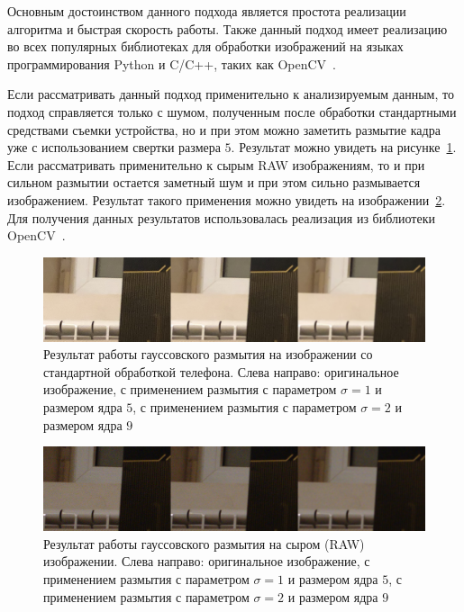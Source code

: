 Основным достоинством данного подхода является простота реализации алгоритма и быстрая скорость работы. Также данный подход имеет реализацию во всех популярных библиотеках для обработки изображений на языках программирования Python и C/C++, таких как OpenCV~\autocite{OpenCVLib}.

Если рассматривать данный подход применительно к анализируемым данным, то подход справляется только с шумом, полученным после обработки стандартными средствами съемки устройства, но и при этом можно заметить размытие кадра уже с использованием свертки размера $5$. Результат можно увидеть на рисунке~\ref{fig:apple_noise_gauss_comparison}. Если рассматривать применительно к сырым RAW изображениям, то и при сильном размытии остается заметный шум и при этом сильно размывается изображением. Результат такого применения можно увидеть на изображении~\ref{fig:real_noise_gauss_comparison}. Для получения данных результатов использовалась реализация из библиотеки OpenCV~\autocite{OpenCVLib}.

\begin{figure}[h]
	\centering
	\includegraphics[width=\textwidth]{img/apple_noise_gaussian_params_comparison}
	\caption{Результат работы гауссовского размытия на изображении со стандартной обработкой телефона. Слева направо: оригинальное изображение, с применением размытия с параметром $\sigma = 1$ и размером ядра $5$, с применением размытия с параметром $\sigma = 2$ и размером ядра $9$}
	\label{fig:apple_noise_gauss_comparison}
\end{figure}

\begin{figure}[h]
	\centering
	\includegraphics[width=\textwidth]{img/real_noise_gaussian_params_comparison}
	\caption{Результат работы гауссовского размытия на сыром (RAW) изображении. Слева направо: оригинальное изображение, с применением размытия с параметром $\sigma = 1$ и размером ядра $5$, с применением размытия с параметром $\sigma = 2$ и размером ядра $9$}
	\label{fig:real_noise_gauss_comparison}
\end{figure}

